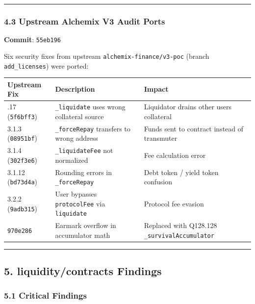 \documentclass[
]{article}
\newcounter{none} %
\begin{document}
\begin{center}\rule{0.5\linewidth}{0.5pt}\end{center}

\subsubsection{4.3 Upstream Alchemix V3 Audit
Ports}\label{43-upstream-alchemix-v3-audit-ports}

\textbf{Commit}: \texttt{55eb196}

Six security fixes from upstream \texttt{alchemix-finance/v3-poc}
(branch \texttt{add\_licenses}) were ported:

{\def\LTcaptype{none} %
\begin{longtable}[]{@{}lll@{}}
\toprule\noalign{}
Upstream Fix & Description & Impact \\
\midrule\noalign{}
\endhead
\bottomrule\noalign{}
\endlastfoot
3.1.17 (\texttt{5f6bff3}) & \texttt{\_liquidate} uses wrong collateral
source & Liquidator drains other users\textquotesingle{} collateral \\
3.1.3 (\texttt{08951bf}) & \texttt{\_forceRepay} transfers to wrong
address & Funds sent to contract instead of transmuter \\
3.1.4 (\texttt{302f3e6}) & \texttt{\_liquidateFee} not normalized & Fee
calculation error \\
3.1.12 (\texttt{bd73d4a}) & Rounding errors in \texttt{\_forceRepay} &
Debt token / yield token confusion \\
3.2.2 (\texttt{9adb315}) & User bypasses \texttt{protocolFee} via
\texttt{liquidate} & Protocol fee evasion \\
\texttt{970e286} & Earmark overflow in accumulator math & Replaced with
Q128.128 \texttt{\_survivalAccumulator} \\
\end{longtable}
}

\begin{center}\rule{0.5\linewidth}{0.5pt}\end{center}

\subsection{5. liquidity/contracts
Findings}\label{5-liquiditycontracts-findings}

\subsubsection{5.1 Critical Findings}\label{51-critical-findings}
\end{document}
